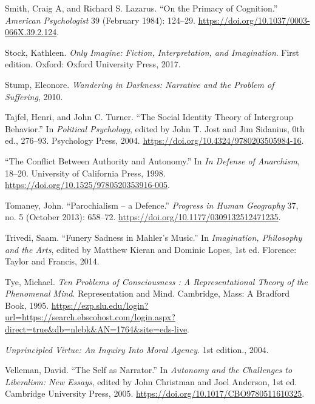 \documentclass[phdthesis,12pt,final]{wuthesis}
\newlength{\cslhangindent}
\newenvironment{CSLReferences}[2] %
{\begin{list}{}{%
	\setlength{\itemindent}{0pt}
	\setlength{\leftmargin}{0pt}
	\setlength{\parsep}{0pt}
	\ifodd #1
	\setlength{\leftmargin}{\cslhangindent}
	\setlength{\itemindent}{-1\cslhangindent}
	\fi
	\setlength{\itemsep}{#2\baselineskip}}}
{\end{list}}
\theoremstyle{definition}
\theoremstyle{definition}
\theoremstyle{definition}
\theoremstyle{definition}
\theoremstyle{remark}
\begin{document}
\begin{CSLReferences}{1}{0}
Smith, Craig A, and Richard S. Lazarus. {``On the {Primacy} of {Cognition}.''} \emph{American Psychologist} 39 (February 1984): 124--29. \url{https://doi.org/10.1037/0003-066X.39.2.124}.

Stock, Kathleen. \emph{Only Imagine: Fiction, Interpretation, and Imagination}. First edition. Oxford: Oxford University Press, 2017.

Stump, Eleonore. \emph{Wandering in {Darkness}: {Narrative} and the {Problem} of {Suffering}}, 2010.

Tajfel, Henri, and John C. Turner. {``The {Social Identity Theory} of {Intergroup Behavior}.''} In \emph{Political {Psychology}}, edited by John T. Jost and Jim Sidanius, 0th ed., 276--93. Psychology Press, 2004. \url{https://doi.org/10.4324/9780203505984-16}.

{``The {Conflict Between Authority} and {Autonomy}.''} In \emph{In {Defense} of {Anarchism}}, 18--20. University of California Press, 1998. \url{https://doi.org/10.1525/9780520353916-005}.

Tomaney, John. {``Parochialism -- a Defence.''} \emph{Progress in Human Geography} 37, no. 5 (October 2013): 658--72. \url{https://doi.org/10.1177/0309132512471235}.

Trivedi, Saam. {``Funery {Sadness} in {Mahler}'s {Music}.''} In \emph{Imagination, {Philosophy} and the {Arts}}, edited by Matthew Kieran and Dominic Lopes, 1st ed. Florence: {Taylor and Francis}, 2014.

Tye, Michael. \emph{Ten {Problems} of {Consciousness} : {A Representational Theory} of the {Phenomenal Mind}}. Representation and {Mind}. Cambridge, Mass: A Bradford Book, 1995. \url{https://ezp.slu.edu/login?url=https://search.ebscohost.com/login.aspx?direct=true&db=nlebk&AN=1764&site=eds-live}.

\emph{Unprincipled {Virtue}: {An Inquiry Into Moral Agency}}. 1st edition., 2004.

Velleman, David. {``The {Self} as {Narrator}.''} In \emph{Autonomy and the {Challenges} to {Liberalism}: {New Essays}}, edited by John Christman and Joel Anderson, 1st ed. Cambridge University Press, 2005. \url{https://doi.org/10.1017/CBO9780511610325}.


\end{CSLReferences}
\end{document}

